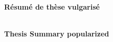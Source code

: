 \vspace{3cm}\strut\\
\begin{center}

{\textbf{\Large Résumé de thèse vulgarisé}}\\\vspace{0.45cm}    

\begin{minipage}{0.85\linewidth}
{\myDefautStyle\vulga}
\end{minipage}\vspace{1cm}\\

{\textbf{\Large Thesis Summary popularized}}\\\vspace{0.35cm}    

\begin{minipage}{0.85\linewidth}
{\myDefautStyle\pop}
\end{minipage}\vspace{1cm}\\
\end{center}
\clearpage
